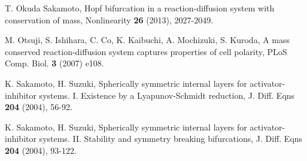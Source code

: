 \documentclass[a4,10pt]{article}
\begin{document}
\begin{thebibliography}{99}
 T. Okuda Sakamoto,
Hopf bifurcation in a reaction-diffusion system with conservation of mass,
Nonlinearity {\bf 26} (2013), 2027-2049.

 M. Otsuji, S. Ishihara, C. Co, K. Kaibuchi, A. Mochizuki, S. Kuroda,  
{A mass conserved reaction-diffusion system captures properties of cell polarity}, 
PLoS Comp. Biol. {\bf 3} (2007) e108. 

K. Sakamoto, H. Suzuki, Spherically symmetric internal layers for activator-inhibitor systems. I. Existence by a Lyapunov-Schmidt reduction,
J. Diff. Eqns {\bf 204} (2004), 56-92. 

K. Sakamoto, H. Suzuki,
Spherically symmetric internal layers for activator-inhibitor systems. II. Stability and symmetry breaking bifurcations,
J. Diff. Eqns {\bf 204} (2004), 93-122.


\end{thebibliography}
\end{document}
